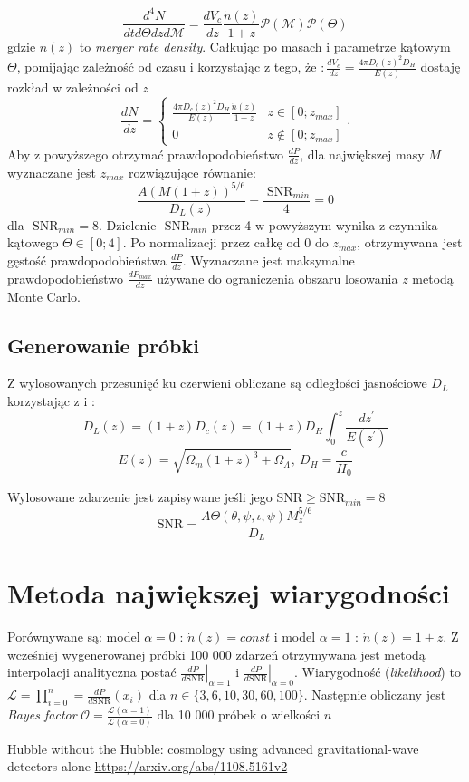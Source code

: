\documentclass{article}
\begin{document}
\begin{equation}
\frac{d^4N}{dt d\Theta dz d \mathcal{M}}=\frac{dV_c}{dz}\frac{\dot{n}(z)}{1+z} \mathcal{P}(\mathcal{M})\mathcal{P}(\Theta)  
\end{equation}
gdzie $\dot{n}(z)$ to \textit{merger rate density}. Całkując po masach i parametrze kątowym $\Theta$, pomijając zależność od czasu i korzystając z tego, że $:\frac{dV_c}{dz}= \frac{4\pi D_c(z)^2 D_H}{E(z)}$ \cite[,Wzór 21]{hubble} dostaję rozkład w zależności od $z$
\begin{equation}
\frac{dN}{dz}=\begin{cases}\frac{4\pi D_c(z)^2 D_H}{E(z)}\frac{\dot{n}(z)}{1+z}  & z\in[0;z_{max}]\\
0 & z\notin[0;z_{max}]
\end{cases}.
\end{equation}
Aby z powyższego otrzymać prawdopodobieństwo $\frac{dP}{dz}$, dla największej masy $M$ wyznaczane jest $z_{max}$ rozwiązujące równanie:
\begin{equation}
\frac{A (M(1+z))^{5/6}}{D_L(z)}-\frac{\mbox{ SNR}_{min}}{4}=0
\end{equation}
dla $\mbox{ SNR}_{min} = 8$. Dzielenie $\mbox{ SNR}_{min}$ przez 4 w powyższym wynika z czynnika kątowego $\Theta \in[0;4] $. Po normalizacji przez całkę od $0$ do $z_{max}$, otrzymywana jest gęstość prawdopodobieństwa $\frac{dP}{dz}$. Wyznaczane jest maksymalne prawdopodobieństwo $ \frac{dP_{max}}{dz}$ używane do ograniczenia obszaru losowania $z$ metodą Monte Carlo.
\subsection{Generowanie próbki}
Z wylosowanych przesunięć ku czerwieni obliczane są odległości jasnościowe $D_L$ korzystając z \cite[,Wzór 19]{hubble} i \cite[,Wzór 20]{hubble}:
\begin{equation}
D_L(z)=(1+z) D_c(z)=(1+z)D_H \int_{0}^{z}\dfrac{dz^\prime}{E(z^\prime)}
\end{equation}
\begin{equation}
E(z)=\sqrt{\Omega_m(1+z)^3+\Omega_\Lambda},\ D_H=\frac{c}{H_0}
\end{equation}

Wylosowane zdarzenie jest zapisywane jeśli jego $\mbox{SNR} \geq \mbox{SNR}_{min}=8$
\begin{equation}
\mbox{SNR}=\frac{A\Theta(\theta, \psi, \iota, \psi) M_z^{5/6}}{D_L}
\end{equation}
\section{Metoda największej wiarygodności}
Porównywane są: model $\alpha=0$ : $\dot n (z)=const $ i model $\alpha=1$ : $\dot n (z)=1+z $. Z wcześniej wygenerowanej próbki 100 000 zdarzeń otrzymywana jest metodą interpolacji analityczna postać $\left.\frac{dP}{d\mbox{SNR}} \right |_{\alpha=1}$ i $\left.\frac{dP}{d\mbox{SNR}} \right |_{\alpha=0}$. Wiarygodność (\textit{likelihood}) to $\mathcal{L}=\prod_{i=0}^{n}=\frac{dP}{d\mbox{SNR}}(x_i)$ dla $n\in\{3,6,10,30,60,100\}$. Następnie obliczany jest \textit{Bayes factor} $ \mathcal{O}=\frac{\mathcal{L}(\alpha =1)}{\mathcal{L}(\alpha =0)}$ dla 10 000 próbek o wielkości $n$


\begin{thebibliography}{9}
Hubble without the Hubble: cosmology using advanced gravitational-wave detectors alone
\url{https://arxiv.org/abs/1108.5161v2}
\end{thebibliography}
\end{document}
